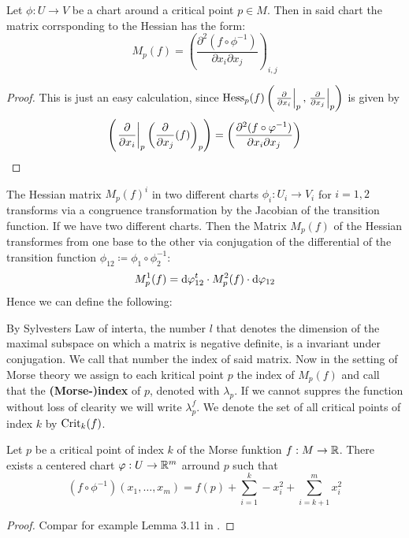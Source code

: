 \begin{corollary}\label{cor: local form of the Hessian}
	Let $\phi:U\to V$ be a  chart around a critical point $p\in M$. Then in said chart the matrix corrsponding to the Hessian has the form:
	\begin{equation*}
		M_p(f)=\left(\frac{\partial^2 (f\circ \phi^{-1})}{\partial x_i\partial x_j}\right)_{i,j}
	\end{equation*}
\end{corollary}
\begin{proof}
	This is just an easy calculation, since $\operatorname{\mathrm{Hess}}_p(f)\left(\left.\frac{\partial }{\partial x_i}\right|_{p},\left.\frac{\partial }{\partial x_j}\right|_{p}\right)$ is given by
	\begin{equation*}
		\left(\left.\frac{\partial }{\partial x_i}\right|_{p}\left(\frac{\partial}{\partial x_j}(f)\right)_p\right)=\left(\frac{\partial^2 (f\circ \varphi^{-1})}{\partial x_i\partial x_j}\right)
	\end{equation*}
\end{proof}


The Hessian matrix $M_p(f)^i$ in two different charts $\phi_i:U_i\to V_i$ for $i=1,2$ transforms via a congruence transformation by the Jacobian of the transition function. 
If we have two different charts. Then the Matrix $M_p(f)$ of the Hessian transformes from one base to the other via conjugation of the differential of the transition function $\phi_{12}\coloneq \phi_1 \circ \phi_2^{-1}$:
\begin{equation*}
	M_p^1(f)=\mathop{}\!\mathrm{d} \varphi_{12}^t  \cdot   M_p^2(f)   \cdot   \mathop{}\!\mathrm{d} \varphi_{12}
\end{equation*} Hence we can define the following:

\begin{definition}
	By Sylvesters Law of interta, the number $l$ that denotes the dimension of the maximal subspace on which a matrix is negative definite, is a invariant under conjugation. We call that number the index of said matrix. Now in the setting of Morse theory we assign to each kritical point $p$ the index of $M_p(f)$ and call that the {\textbf{(Morse-)index }} of $p$, denoted with $\lambda_p$. If we cannot suppres the function without loss of clearity we will write $\lambda^f_p$. We denote the set of all critical points of index $k$ by $\mathrm{Crit}_k(f)$.
\end{definition}


\begin{theorem}
	Let $p$ be a critical point of index $k$ of the Morse funktion $f:M\to \mathbb{R}$. There exists a centered chart $\varphi:U\to \mathbb{R}^m$ arround $p$ such that 
	\begin{equation*}
		(f\circ \phi^{-1})(x_1,\dots, x_m)=f(p)+\sum_{i=1}^{k}-x_i^2+\sum_{i=k+1}^{m}x_i^2
	\end{equation*}
\end{theorem}
\begin{proof}
	Compar for example Lemma 3.11 in \cite{banyaga2004lectures}. 
\end{proof}



